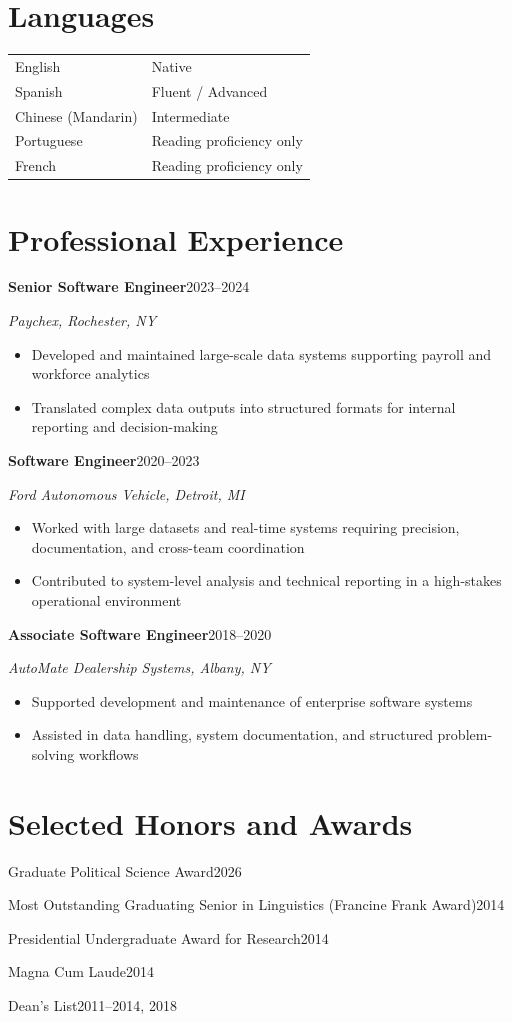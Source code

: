 \documentclass[11pt,letterpaper]{article}
\newcommand{\entry}[3]{%
  \par{\bfseries #1}\hfill #2\par\nopagebreak
  {\itshape #3}\par\nopagebreak
}
\newcommand{\oneline}[2]{\par #1\hfill #2\par}
\newcommand{\gap}{\par\vspace{7pt}}
\begin{document}
\section*{Languages}

\begin{tabular}{@{}ll@{}}
  English & Native \\
  Spanish & Fluent / Advanced \\
  Chinese (Mandarin) & Intermediate \\
  Portuguese & Reading proficiency only \\
  French & Reading proficiency only \\
\end{tabular}

\section*{Professional Experience}

\entry{Senior Software Engineer}{2023–2024}{Paychex, Rochester, NY}
\begin{itemize}
  \item Developed and maintained large-scale data systems supporting payroll and workforce analytics
  \item Translated complex data outputs into structured formats for internal reporting and decision-making
\end{itemize}
\gap
\entry{Software Engineer}{2020–2023}{Ford Autonomous Vehicle, Detroit, MI}
\begin{itemize}
  \item Worked with large datasets and real-time systems requiring precision, documentation, and cross-team coordination
  \item Contributed to system-level analysis and technical reporting in a high-stakes operational environment
\end{itemize}
\gap
\entry{Associate Software Engineer}{2018–2020}{AutoMate Dealership Systems, Albany, NY}
\begin{itemize}
  \item Supported development and maintenance of enterprise software systems
  \item Assisted in data handling, system documentation, and structured problem-solving workflows
\end{itemize}

\section*{Selected Honors and Awards}

\oneline{Graduate Political Science Award}{2026}
\oneline{Most Outstanding Graduating Senior in Linguistics (Francine Frank Award)}{2014}
\oneline{Presidential Undergraduate Award for Research}{2014}
\oneline{Magna Cum Laude}{2014}
\oneline{Dean’s List}{2011–2014, 2018}
\end{document}
